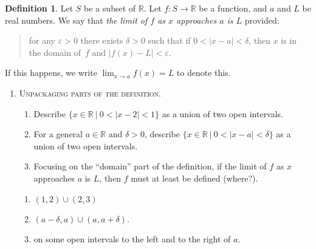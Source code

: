 \documentclass[12pt]{amsart}
\def\de{\delta}
\def\ds{\displaystyle}
\def\d{\delta}
\def\e{\varepsilon}
\newcommand{\R}{{\mathbb{R}}}
\numberwithin{equation}{section}
\theoremstyle{plain} %
\theoremstyle{definition}
\newtheorem{defn}[equation]{Definition}
\theoremstyle{remark}
\begin{document}
\begin{defn}
Let $S$ be a subset of $\R$. Let $f: S \to \R$ be a function, and $a$ and $L$ be real numbers. We say that \emph{the limit of $f$ as $x$ approaches $a$ is $L$} provided:
\begin{quote} for any $\e>0$ there exists $\de>0$ such that if $0< | x-a | < \de$, then $x$ is in the domain of~$f$ and $|f(x) - L| <\e$.
\end{quote}
If this happens, we write $\ds \lim_{x\to a} f(x) = L$ to denote this.
\end{defn}


\begin{enumerate}
\item \textsc{Unpackaging parts of the definition.}
\begin{enumerate}
\item Describe $\{ x\in \R \ | \ 0< |x-2| < 1\}$ as a union of two open intervals.
\item For a general $a\in \R$ and $\delta>0$, describe $\{ x\in \R \ | \ 0< |x-a| <  \de\}$ as a union of two open intervals.
\item Focusing on the ``domain'' part of the definition, if the limit of $f$ as $x$ approaches $a$ is $L$, then $f$ must at least be defined \underline{\phantom{on some open intervals to the left and right of $a$}} (where?).
\end{enumerate}

\begin{framed}
\begin{enumerate}
\item $(1,2)\cup(2,3)$
\item $(a-\d,a)\cup(a,a+\d)$.
\item on some open intervals to the left and to the right of $a$.
\end{enumerate}
\end{framed}


\end{enumerate}
\end{document}
